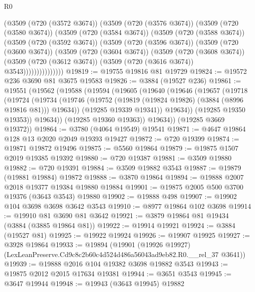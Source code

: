 \begin{lexlean}{R0}
\begin{coremodule}
          (@3509
            (@720 (@3572 @3674))
            (@3509
              (@720 (@3576 @3674))
              (@3509
                (@720 (@3580 @3674))
                (@3509
                  (@720 (@3584 @3674))
                  (@3509
                    (@720 (@3588 @3674))
                    (@3509
                      (@720 (@3592 @3674))
                      (@3509
                        (@720 (@3596 @3674))
                        (@3509
                          (@720 (@3600 @3674))
                          (@3509
                            (@720 (@3604 @3674))
                            (@3509
                              (@720 (@3608 @3674))
                              (@3509
                                (@720 (@3612 @3674))
                                (@3509 (@720 (@3616 @3674)) @3543)))))))))))))))
@19819 := @19755 @19816 @81 @19729
@19824 := @19572 @236 @3690 @81 @3675 @19583
@19826 := @3884 (@19527 @236)
@19861 := @19551
    (@19562
      (@19588
        (@19594
          (@19605
            (@19640
              (@19646
                (@19657
                  (@19718
                    (@19724
                      (@19734
                        (@19746 (@19752 (@19819 (@19824 @19826) (@3884 (@8996 @19816 @81))) @19634))
                        (@19285 @19339 @19341))
                      @19634))
                  (@19285 @19350 @19353))
                @19634))
            (@19285 @19360 @19363))
          @19634))
      (@19285 @3669 @19372))
@19864 := @3780 (@4064 @19549) @19541
@19871 := @4647 @19864 @128 @13 @2020 @2049 @19393 @19427
@19872 := @720 @19399
@19874 := @19871 @19872 @19496
@19875 := @5560 @19864
@19879 := @19875 @1507 @2019 @19385 @19392
@19880 := @720 @19387
@19881 := @3509 @19880
@19882 := @720 @19391
@19884 := @3509 @19882 @3543
@19887 := @19879 (@19881 @19884) @19872
@19888 := @3870 @19864
@19894 := @19888 @2007 @2018 @19377 @19384 @19880 @19884
@19901 := @19875 @2005 @500 @3700 @19376 (@3643 @3543) @19880
@19902 := @19888 @498
@19907 := @19902 @104 @3698 @3698 @3642 @3543
@19910 := @8977 @19864 @102 @3698
@19914 := @19910 @81 @3690 @81 @3642
@19921 := @3879 @19864 @81 @19434 (@3884 (@3885 @19864 @81))
@19922 := @19914 @19921
@19924 := @3884 (@19527 @81)
@19925 := @19922 @19924
@19926 := @19907 @19925
@19927 := @3928 @19864
@19933 := @19894
    (@19901 (@19926 @19927) (LexLeanPreserve.Cd9c8c2b60c4d524d486a56043ad9eb82.R0.__rel_37 @3641))
@19939 := @19888 @2016 @104 @19382 @3698 @19882 @3543
@19943 := @19875 @2012 @2015 @17634 @19381
@19944 := @3651 @3543
@19945 := @3647 @19944
@19948 := @19943 (@3643 @19945) @19882

\end{coremodule}
\end{lexlean}
